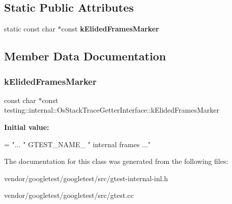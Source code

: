 \subsection*{Static Public Attributes}
\begin{DoxyCompactItemize}
\item 
static const char $\ast$const {\bfseries k\+Elided\+Frames\+Marker}
\end{DoxyCompactItemize}


\subsection{Member Data Documentation}
\mbox{\label{classtesting_1_1internal_1_1_os_stack_trace_getter_interface_a669c49ce9ae05935e70bddb35a81ceb8}} 
\subsubsection{\texorpdfstring{k\+Elided\+Frames\+Marker}{kElidedFramesMarker}}
{\footnotesize\ttfamily const char $\ast$const testing\+::internal\+::\+Os\+Stack\+Trace\+Getter\+Interface\+::k\+Elided\+Frames\+Marker\hspace{0.3cm}{\ttfamily [static]}}

{\bfseries Initial value\+:}
\begin{DoxyCode}
=
    \textcolor{stringliteral}{"... "} GTEST\_NAME\_ \textcolor{stringliteral}{" internal frames ..."}
\end{DoxyCode}


The documentation for this class was generated from the following files\+:\begin{DoxyCompactItemize}
\item 
vendor/googletest/googletest/src/gtest-\/internal-\/inl.\+h\item 
vendor/googletest/googletest/src/gtest.\+cc\end{DoxyCompactItemize}
